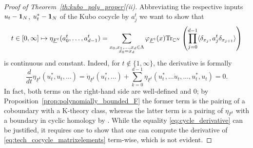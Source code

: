 \documentclass[12pt]{amsart}
\newcommand{\CM}{{\mathbb C}}
\newcommand{\one}{{\bf 1}}
\newcommand{\Tr}{\mbox{\rm Tr}}
\begin{document}
\begin{proof}[Proof of Theorem~\ref{th:kubo_poly_proper}(ii)]
Abbreviating the respective inputs $u_t-\one_N$, $u_t^*-\one_N$ of the Kubo cocycle by $a_j^{t}$ we want to show that
\begin{equation}
\label{eq:tech_cocycle_matrixelements}
t\in [0,\infty]\mapsto \eta_{\underline{F}^t}(a^t_0,\dots,a^t_{d-1})= \sum_{\substack{x_0,x_1,\dots,x_{d} \in \Lambda\\ x_0=x_{d}}}\varphi_{\underline{F}^t}(x) \Tr_{\CM^N}\left(\prod_{j=0}^{d-1} \langle\delta_{x_j}, a^{t}_j\delta_{x_{j+1}}\rangle\right)
\end{equation}
is continuous and constant. Indeed, for $t \notin \{1,\infty\}$, the derivative is formally
\begin{equation}
\label{eq:cycle_derivative}\frac{d}{dt}\eta_{\underline{F}^{t}}(u^*_t, u_t,\dots) = \dot{ \eta}_{\underline{F}^t}(u^*_t,\dots) + \sum_{k=0}^{d-1} \eta_{\underline{F}^t}(u^*_t, \dots \dot{u}_t, \dots, u^*_t, u_t)=0.
\end{equation}
In fact, both terms on the right-hand side are well-defined and $0$; by Proposition~\ref{prop:polynomially_bounded_F} the former term is the pairing of a coboundary with a K-theory class, whereas the latter term is a pairing of $\eta_{F^t}$ with a boundary in cyclic homology by \cite[Proposition 3.3]{Getzler1993OddChern}. While the equality \eqref{eq:cycle_derivative} can be justified, it requires one to show that one can compute the derivative of \eqref{eq:tech_cocycle_matrixelements} term-wise, which is not evident.


\end{proof}
\end{document}
